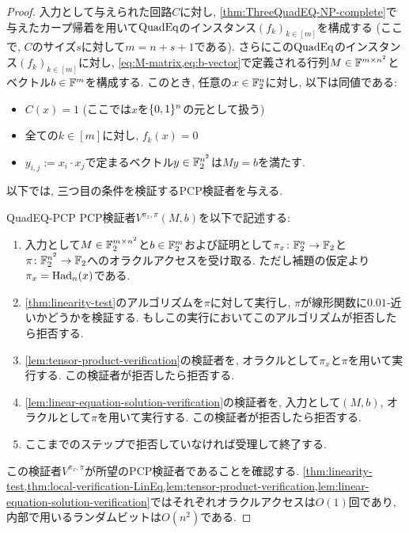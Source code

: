   \begin{proof}
    入力として与えられた回路$C$に対し, \cref{thm:ThreeQuadEQ-NP-complete}で与えたカープ帰着を用いて$\text{QuadEq}$のインスタンス$(f_k)_{k\in [m]}$を構成する (ここで, $C$のサイズ$s$に対して$m=n+s+1$である).
    さらにこの$\text{QuadEq}$のインスタンス$(f_k)_{k\in[m]}$に対し, \cref{eq:M-matrix,eq:b-vector}で定義される行列$M\in\mathbb{F}^{m\times n^2}$とベクトル$b\in\mathbb{F}^m$を構成する.
    このとき, 任意の$x\in\mathbb{F}_2^n$に対し, 以下は同値である:
    \begin{itemize}
      \item $C(x)=1$ (ここでは$x$を$\{0,1\}^n$の元として扱う)
      \item 全ての$k\in[m]$に対し, $f_k(x)=0$
      \item $y_{i,j}:=x_i\cdot x_j$で定まるベクトル$y\in\mathbb{F}_2^{n^2}$は$My=b$を満たす.
    \end{itemize}
  
    以下では, 三つ目の条件を検証するPCP検証者を与える.

    \begin{algo}{}{QuadEQ-PCP}
      PCP検証者$V^{\pi_x,\pi}(M,b)$を以下で記述する:
      \begin{enumerate}
        \item 入力として$M\in\mathbb{F}_2^{m\times n^2}$と$b\in\mathbb{F}_2^m$および証明として$\pi_x\colon\mathbb{F}_2^n\to\mathbb{F}_2$と$\pi\colon\mathbb{F}_2^{n^2}\to\mathbb{F}_2$へのオラクルアクセスを受け取る. ただし補題の仮定より$\pi_x=\mathrm{Had}_n(x)$である.
        \item \cref{thm:linearity-test}のアルゴリズムを$\pi$に対して実行し, $\pi$が線形関数に$0.01$-近いかどうかを検証する. もしこの実行においてこのアルゴリズムが拒否したら拒否する.
        \item \cref{lem:tensor-product-verification}の検証者を, オラクルとして$\pi_x$と$\pi$を用いて実行する. この検証者が拒否したら拒否する.
        \item \cref{lem:linear-equation-solution-verification}の検証者を, 入力として$(M,b)$, オラクルとして$\pi$を用いて実行する. この検証者が拒否したら拒否する.
        \item ここまでのステップで拒否していなければ受理して終了する.
      \end{enumerate}
    \end{algo}

    この検証者$V^{\pi_x,\pi}$が所望のPCP検証者であることを確認する.
    \cref{thm:linearity-test,thm:local-verification-LinEq,lem:tensor-product-verification,lem:linear-equation-solution-verification}ではそれぞれオラクルアクセスは$O(1)$回であり, 内部で用いるランダムビットは$O(n^2)$である.


\end{proof}
